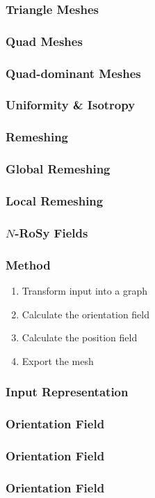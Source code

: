\documentclass[aspectratio=43,sanserif,professionalfonts]{beamer}
\begin{document}
\begin{frame}
	\frametitle{Triangle Meshes}
\end{frame}

\begin{frame}
	\frametitle{Quad Meshes}
\end{frame}

\begin{frame}
	\frametitle{Quad-dominant Meshes}
\end{frame}

\begin{frame}
	\frametitle{Uniformity \& Isotropy}
\end{frame}

\begin{frame}
	\frametitle{Remeshing}
\end{frame}

\begin{frame}
	\frametitle{Global Remeshing}
\end{frame}

\begin{frame}
	\frametitle{Local Remeshing}
\end{frame}

\begin{frame}
	\frametitle{$N$-RoSy Fields}
\end{frame}


\begin{frame}
	\frametitle{Method}
	\begin{enumerate}
		\item	Transform input into a graph
		\item	Calculate the orientation field
		\item	Calculate the position field
		\item	Export the mesh
	\end{enumerate}
\end{frame}

\begin{frame}
	\frametitle{Input Representation}
\end{frame}

\begin{frame}
	\frametitle{Orientation Field}
\end{frame}

\begin{frame}
	\frametitle{Orientation Field}
\end{frame}

\begin{frame}
	\frametitle{Orientation Field}
\end{frame}
\end{document}
